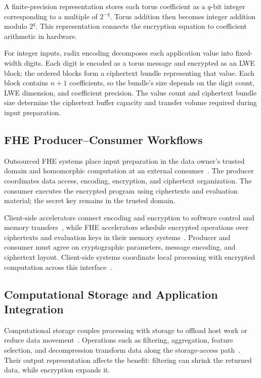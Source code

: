 \documentclass[sigconf,anonymous,balance=false]{acmart}
\newcommand{\bodypar}{\par\vskip 0pt plus 6pt\relax}
\begin{document}
A finite-precision representation stores each torus coefficient as a $q$-bit integer corresponding to a multiple of $2^{-q}$. Torus addition then becomes integer addition modulo $2^q$. This representation connects the encryption equation to coefficient arithmetic in hardware.
\bodypar

For integer inputs, radix encoding decomposes each application value into fixed-width digits. Each digit is encoded as a torus message and encrypted as an LWE block; the ordered blocks form a ciphertext bundle representing that value. Each block contains $n+1$ coefficients, so the bundle's size depends on the digit count, LWE dimension, and coefficient precision. The value count and ciphertext bundle size determine the ciphertext buffer capacity and transfer volume required during input preparation.

\subsection{FHE Producer--Consumer Workflows}
Outsourced FHE systems place input preparation in the data owner's trusted domain and homomorphic computation at an external consumer~\cite{krieger2024aloha,yune2025abcfhe,gupta2024memfhe}. The producer coordinates data access, encoding, encryption, and ciphertext organization. The consumer executes the encrypted program using ciphertexts and evaluation material; the secret key remains in the trusted domain.
\bodypar

Client-side accelerators connect encoding and encryption to software control and memory transfers~\cite{krieger2024aloha,yune2025abcfhe}, while FHE accelerators schedule encrypted operations over ciphertexts and evaluation keys in their memory systems~\cite{xu2026hera,zhou2023fhemem,vanbeirendonck2023fpt}. Producer and consumer must agree on cryptographic parameters, message encoding, and ciphertext layout. Client-side systems coordinate local processing with encrypted computation across this interface~\cite{vanderhagen2022choco}.

\subsection{Computational Storage and Application Integration}
Computational storage couples processing with storage to offload host work or reduce data movement~\cite{snia2025csmodel}. Operations such as filtering, aggregation, feature selection, and decompression transform data along the storage-access path~\cite{ruan2019insider}. Their output representation affects the benefit: filtering can shrink the returned data, while encryption expands it.
\bodypar
\end{document}
